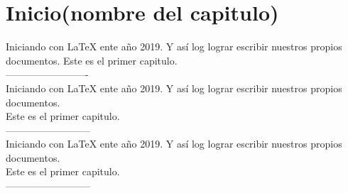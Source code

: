 \documentclass[11pt]{book}
\begin{document}
\chapter{Inicio(nombre del capitulo)}

Iniciando con LaTeX ente año 2019. Y así log lograr escribir nuestros propios documentos.
Este es el primer capitulo. 
\\-------------------------\\
Iniciando con LaTeX ente año 2019. Y así log lograr escribir nuestros propios documentos.\\
Este es el primer capitulo. 
\\--------------------------\\
Iniciando con LaTeX ente año 2019. Y así log lograr escribir nuestros propios documentos.\\

Este es el primer capitulo. 
\\--------------------------\\
\end{document}
